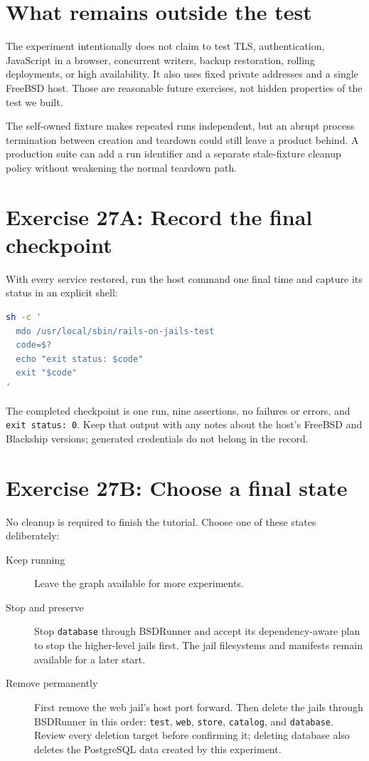 \section{What remains outside the test}

The experiment intentionally does not claim to test TLS, authentication,
JavaScript in a browser, concurrent writers, backup restoration, rolling
deployments, or high availability. It also uses fixed private addresses and a
single FreeBSD host. Those are reasonable future exercises, not hidden
properties of the test we built.

The self-owned fixture makes repeated runs independent, but an abrupt process
termination between creation and teardown could still leave a product behind.
A production suite can add a run identifier and a separate stale-fixture
cleanup policy without weakening the normal teardown path.

\section{Exercise 27A: Record the final checkpoint}

With every service restored, run the host command one final time and capture
its status in an explicit shell:

\begin{lstlisting}[language=sh]
sh -c '
  mdo /usr/local/sbin/rails-on-jails-test
  code=$?
  echo "exit status: $code"
  exit "$code"
'
\end{lstlisting}

The completed checkpoint is one run, nine assertions, no failures or errors,
and \texttt{exit status: 0}. Keep that output with any notes about the host's
FreeBSD and Blackship versions; generated credentials do not belong in the
record.

\section{Exercise 27B: Choose a final state}

No cleanup is required to finish the tutorial. Choose one of these states
deliberately:

\begin{description}
  \item[Keep running] Leave the graph available for more experiments.
  \item[Stop and preserve] Stop \texttt{database} through BSDRunner and accept
    its dependency-aware plan to stop the higher-level jails first. The jail
    filesystems and manifests remain available for a later start.
  \item[Remove permanently] First remove the web jail's host port forward.
    Then delete the jails through BSDRunner in this order: \texttt{test},
    \texttt{web}, \texttt{store}, \texttt{catalog}, and \texttt{database}.
    Review every deletion target before confirming it; deleting database also
    deletes the PostgreSQL data created by this experiment.
\end{description}

